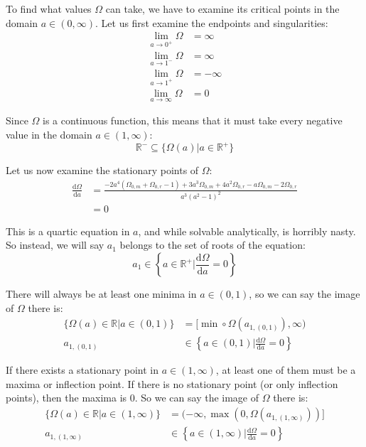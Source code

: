 \documentclass[a4paper]{scrartcl}
\begin{document}
To find what values \(\Omega\) can take, we have to examine its critical points in the domain \(a \in (0, \infty)\). Let us first examine the endpoints and singularities:
\begin{align*}
    \lim_{a \to 0^+} \Omega &= \infty \\
    \lim_{a \to 1^-} \Omega &= \infty \\
    \lim_{a \to 1^+} \Omega &= -\infty \\
    \lim_{a \to \infty} \Omega &= 0
\end{align*}

Since \(\Omega\) is a continuous function, this means that it must take every negative value in the domain \(a \in (1, \infty)\):
\[\mathbb{R}^- \subseteq \{\Omega(a) | a \in \mathbb{R}^+\}\]

Let us now examine the stationary points of \(\Omega\):
\begin{align*}
    \frac{\mathrm{d} \Omega}{\mathrm{d} a} &= \frac{-2 a^4 (\Omega_{0, m} + \Omega_{0, r} - 1) + 3 a^3 \Omega_{0, m} + 4 a^2 \Omega_{0, r} - a \Omega_{0, m} - 2 \Omega_{0, r}}{a^3 \left(a^2 - 1\right)^2} \\
    &= 0
\end{align*}

This is a quartic equation in \(a\), and while solvable analytically, is horribly nasty. So instead, we will say \(a_1\) belongs to the set of roots of the equation:
\[a_1 \in \left\{a \in \mathbb{R}^+ \bigg| \frac{\mathrm{d} \Omega}{\mathrm{d} a} = 0\right\}\]

There will always be at least one minima in \(a \in (0, 1)\), so we can say the image of \(\Omega\) there is:
\begin{align*}
    \{\Omega(a) \in \mathbb{R} | a \in (0, 1)\} &= [\min\circ\Omega(a_{1, (0, 1)}), \infty) \\
    a_{1, (0, 1)} &\in \left\{a \in (0, 1) \bigg| \frac{\mathrm{d} \Omega}{\mathrm{d} a} = 0\right\}
\end{align*}

If there exists a stationary point in \(a \in (1, \infty)\), at least one of them must be a maxima or inflection point. If there is no stationary point (or only inflection points), then the maxima is 0. So we can say the image of \(\Omega\) there is:
\begin{align*}
    \{\Omega(a) \in \mathbb{R} | a \in (1, \infty)\} &= (-\infty, \max(0, \Omega(a_{1, (1, \infty)}))] \\
    a_{1, (1, \infty)} &\in \left\{a \in (1, \infty) \bigg| \frac{\mathrm{d} \Omega}{\mathrm{d} a} = 0\right\}
\end{align*}
\end{document}
